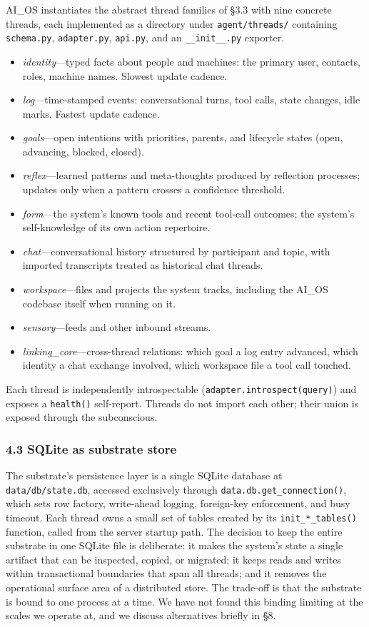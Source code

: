 \documentclass[11pt,letterpaper]{article}
\begin{document}
AI\_OS instantiates the abstract thread families of §3.3 with nine concrete threads, each implemented as a directory under \texttt{agent/threads/} containing \texttt{schema.py}, \texttt{adapter.py}, \texttt{api.py}, and an \texttt{\_\_init\_\_.py} exporter.

\begin{itemize}
  \item \emph{identity}---typed facts about people and machines: the primary user, contacts, roles, machine names. Slowest update cadence.
  \item \emph{log}---time-stamped events: conversational turns, tool calls, state changes, idle marks. Fastest update cadence.
  \item \emph{goals}---open intentions with priorities, parents, and lifecycle states (open, advancing, blocked, closed).
  \item \emph{reflex}---learned patterns and meta-thoughts produced by reflection processes; updates only when a pattern crosses a confidence threshold.
  \item \emph{form}---the system's known tools and recent tool-call outcomes; the system's self-knowledge of its own action repertoire.
  \item \emph{chat}---conversational history structured by participant and topic, with imported transcripts treated as historical chat threads.
  \item \emph{workspace}---files and projects the system tracks, including the AI\_OS codebase itself when running on it.
  \item \emph{sensory}---feeds and other inbound streams.
  \item \emph{linking\_core}---cross-thread relations: which goal a log entry advanced, which identity a chat exchange involved, which workspace file a tool call touched.
\end{itemize}

Each thread is independently introspectable (\texttt{adapter.introspect(query)}) and exposes a \texttt{health()} self-report. Threads do not import each other; their union is exposed through the subconscious.

\subsubsection*{4.3 SQLite as substrate store}

The substrate's persistence layer is a single SQLite database at \texttt{data/db/state.db}, accessed exclusively through \texttt{data.db.get\_connection()}, which sets row factory, write-ahead logging, foreign-key enforcement, and busy timeout. Each thread owns a small set of tables created by its \texttt{init\_*\_tables()} function, called from the server startup path. The decision to keep the entire substrate in one SQLite file is deliberate: it makes the system's state a single artifact that can be inspected, copied, or migrated; it keeps reads and writes within transactional boundaries that span all threads; and it removes the operational surface area of a distributed store. The trade-off is that the substrate is bound to one process at a time. We have not found this binding limiting at the scales we operate at, and we discuss alternatives briefly in §8.
\end{document}
